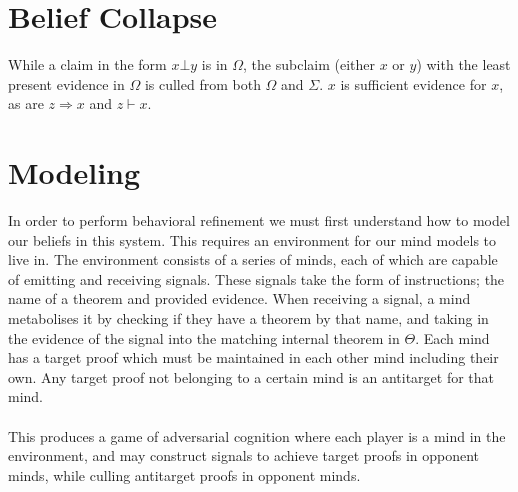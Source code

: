 \documentclass{article}
\begin{document}
	\section{Belief Collapse}
	While a claim in the form $x \bot y$ is in $\Omega$, the subclaim (either $x$ or $y$) with the least present evidence in $\Omega$ is culled from both $\Omega$ and $\Sigma$. $x$ is sufficient evidence for $x$, as are $z \Rightarrow x$ and $z \vdash  x$.
	\section{Modeling}
	In order to perform behavioral refinement we must first understand how to model our beliefs in this system. This requires an environment for our mind models to live in. The environment consists of a series of minds, each of which are capable of emitting and receiving signals. These signals take the form of instructions; the name of a theorem and provided evidence. When receiving a signal, a mind metabolises it by checking if they have a theorem by that name, and taking in the evidence of the signal into the matching internal theorem in $\Theta$. Each mind has a target proof which must be maintained in each other mind including their own. Any target proof not belonging to a certain mind is an antitarget for that mind.\\\\
	This produces a game of adversarial cognition where each player is a mind in the environment, and may construct signals to achieve target proofs in opponent minds, while culling antitarget proofs in opponent minds. \\\\
\end{document}
